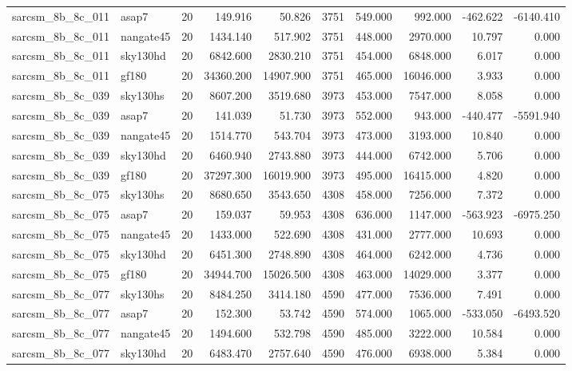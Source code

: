 \begin{tabular}{llrrrrrrrr}
sarcsm\_8b\_8c\_011 & asap7 & 20 & 149.916 & 50.826 & 3751 & 549.000 & 992.000 & -462.622 & -6140.410 \\
sarcsm\_8b\_8c\_011 & nangate45 & 20 & 1434.140 & 517.902 & 3751 & 448.000 & 2970.000 & 10.797 & 0.000 \\
sarcsm\_8b\_8c\_011 & sky130hd & 20 & 6842.600 & 2830.210 & 3751 & 454.000 & 6848.000 & 6.017 & 0.000 \\
sarcsm\_8b\_8c\_011 & gf180 & 20 & 34360.200 & 14907.900 & 3751 & 465.000 & 16046.000 & 3.933 & 0.000 \\
sarcsm\_8b\_8c\_039 & sky130hs & 20 & 8607.200 & 3519.680 & 3973 & 453.000 & 7547.000 & 8.058 & 0.000 \\
sarcsm\_8b\_8c\_039 & asap7 & 20 & 141.039 & 51.730 & 3973 & 552.000 & 943.000 & -440.477 & -5591.940 \\
sarcsm\_8b\_8c\_039 & nangate45 & 20 & 1514.770 & 543.704 & 3973 & 473.000 & 3193.000 & 10.840 & 0.000 \\
sarcsm\_8b\_8c\_039 & sky130hd & 20 & 6460.940 & 2743.880 & 3973 & 444.000 & 6742.000 & 5.706 & 0.000 \\
sarcsm\_8b\_8c\_039 & gf180 & 20 & 37297.300 & 16019.900 & 3973 & 495.000 & 16415.000 & 4.820 & 0.000 \\
sarcsm\_8b\_8c\_075 & sky130hs & 20 & 8680.650 & 3543.650 & 4308 & 458.000 & 7256.000 & 7.372 & 0.000 \\
sarcsm\_8b\_8c\_075 & asap7 & 20 & 159.037 & 59.953 & 4308 & 636.000 & 1147.000 & -563.923 & -6975.250 \\
sarcsm\_8b\_8c\_075 & nangate45 & 20 & 1433.000 & 522.690 & 4308 & 431.000 & 2777.000 & 10.693 & 0.000 \\
sarcsm\_8b\_8c\_075 & sky130hd & 20 & 6451.300 & 2748.890 & 4308 & 464.000 & 6242.000 & 4.736 & 0.000 \\
sarcsm\_8b\_8c\_075 & gf180 & 20 & 34944.700 & 15026.500 & 4308 & 463.000 & 14029.000 & 3.377 & 0.000 \\
sarcsm\_8b\_8c\_077 & sky130hs & 20 & 8484.250 & 3414.180 & 4590 & 477.000 & 7536.000 & 7.491 & 0.000 \\
sarcsm\_8b\_8c\_077 & asap7 & 20 & 152.300 & 53.742 & 4590 & 574.000 & 1065.000 & -533.050 & -6493.520 \\
sarcsm\_8b\_8c\_077 & nangate45 & 20 & 1494.600 & 532.798 & 4590 & 485.000 & 3222.000 & 10.584 & 0.000 \\
sarcsm\_8b\_8c\_077 & sky130hd & 20 & 6483.470 & 2757.640 & 4590 & 476.000 & 6938.000 & 5.384 & 0.000 \\

\end{tabular}
